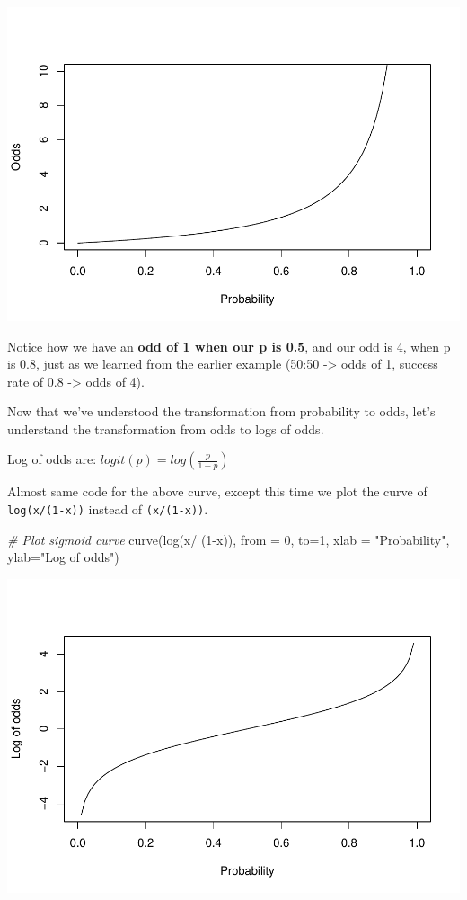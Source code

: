 \documentclass[
]{article}
\newenvironment{Shaded}{\begin{snugshade}}{\end{snugshade}}
\newcommand{\AttributeTok}[1]{\textcolor[rgb]{0.77,0.63,0.00}{#1}}
\newcommand{\CommentTok}[1]{\textcolor[rgb]{0.56,0.35,0.01}{\textit{#1}}}
\newcommand{\DecValTok}[1]{\textcolor[rgb]{0.00,0.00,0.81}{#1}}
\newcommand{\FunctionTok}[1]{\textcolor[rgb]{0.00,0.00,0.00}{#1}}
\newcommand{\NormalTok}[1]{#1}
\newcommand{\SpecialCharTok}[1]{\textcolor[rgb]{0.00,0.00,0.00}{#1}}
\newcommand{\StringTok}[1]{\textcolor[rgb]{0.31,0.60,0.02}{#1}}
\begin{document}
\includegraphics{classification1_files/figure-latex/unnamed-chunk-2-1.pdf}

Notice how we have an \textbf{odd of 1 when our p is 0.5}, and our odd
is 4, when p is 0.8, just as we learned from the earlier example (50:50
-\textgreater{} odds of 1, success rate of 0.8 -\textgreater{} odds of
4).

Now that we've understood the transformation from probability to odds,
let's understand the transformation from odds to logs of odds.

Log of odds are: \(logit(p) = log(\frac{p}{1-p})\)

Almost same code for the above curve, except this time we plot the curve
of \texttt{log(x/(1-x))} instead of \texttt{(x/(1-x))}.

\begin{Shaded}
\begin{Highlighting}[]
\CommentTok{\# Plot sigmoid curve}
\FunctionTok{curve}\NormalTok{(}\FunctionTok{log}\NormalTok{(x}\SpecialCharTok{/}\NormalTok{ (}\DecValTok{1}\SpecialCharTok{{-}}\NormalTok{x)), }\AttributeTok{from =} \DecValTok{0}\NormalTok{, }\AttributeTok{to=}\DecValTok{1}\NormalTok{, }\AttributeTok{xlab =} \StringTok{"Probability"}\NormalTok{, }\AttributeTok{ylab=}\StringTok{"Log of odds"}\NormalTok{)}
\end{Highlighting}
\end{Shaded}

\includegraphics{classification1_files/figure-latex/unnamed-chunk-3-1.pdf}
\end{document}

